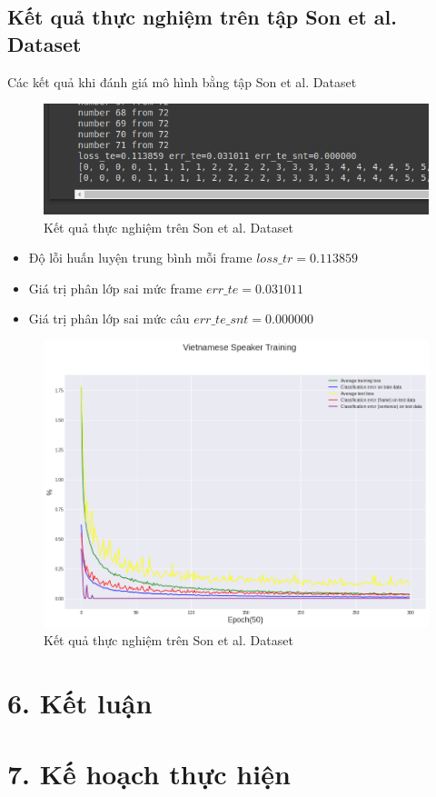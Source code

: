 \documentclass{article}
\begin{document}
	\subsection{Kết quả thực nghiệm trên tập Son et al. Dataset}
	Các kết quả khi đánh giá mô hình bằng tập Son et al. Dataset
	\begin{figure}[H]
		\centering
		\includegraphics[width=.75\textwidth]{result/evaluate_result_vn_speaker.png}
		\caption{Kết quả thực nghiệm trên Son et al. Dataset}
		\label{fig:writing-thesis}
	\end{figure}
	\begin{itemize}
		\item Độ lỗi huấn luyện trung bình mỗi frame $loss\_tr=0.113859$
		\item Giá trị phân lớp sai mức frame $err\_te=0.031011$
		\item Giá trị phân lớp sai mức câu $err\_te\_snt =0.000000$
	\end{itemize}
	\begin{figure}[H]
		\centering
		\includegraphics[width=.75\textwidth]{result/sincnet_vietnamese_plot.png}
		\caption{Kết quả thực nghiệm trên Son et al. Dataset}
		\label{fig:writing-thesis}
	\end{figure}
	\section{6. Kết luận}
	
	\section{7. Kế hoạch thực hiện}
	
\end{document}
